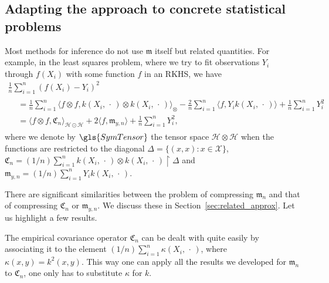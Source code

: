 \documentclass[10pt]{amsart}
\theoremstyle{definition}\newtheorem{defi}[theo]{Definition}\newtheorem{rema}[theo]{Remark}\newtheorem{exam}[theo]{Example}\newtheorem{exem}[theo]{Example}\newtheorem{nota}[theo]{Notation}
\theoremstyle{remark}
\newcommand{\restrr}
{\!\!\upharpoonright\!\!}
\newcommand{\X}{\mathcal{X}}
\newcommand{\cH}{\mathcal{H}}
\newcommand{\fkC}{\mathfrak{C}}
\newcommand{\mean}{\mathfrak{m}}
\begin{document}
\subsection{Adapting the approach to concrete statistical problems} \label{sec:intro_application}
Most methods for inference do not use $\mean$ itself but related quantities. For example, in the least squares problem, where we try to fit observations $Y_i$ through $f(X_i)$ with some function $f$ in an RKHS, we have
\begin{multline*}
\frac{1}{n} \sum_{i=1}^n (f(X_i) - Y_i)^2
\\
\begin{aligned}
&= \frac{1}{n} \sum_{i=1}^n \bigl\langle f \otimes f, k(X_i,\,\cdot\,) \otimes k(X_i,\,\cdot\,) \bigr\rangle_{\otimes} - \frac{2}{n} \sum_{i=1}^n \langle f, Y_i k(X_i,\,\cdot\,) \rangle + \frac{1}{n} \sum_{i=1}^n Y_i^2 \\
&= \langle f \otimes f, \fkC_n \rangle_{\cH \odot \cH} + 2 \langle f, \mean_{y,n} \rangle + \frac{1}{n} \sum_{i=1}^n Y_i^2,
\end{aligned}
\end{multline*}
where we denote by $\gls{SymTensor}$ the tensor space $\cH \otimes \cH$ when the functions are restricted to the diagonal $\Delta = \{(x,x) : x \in \X\}$, $\fkC_n = (1/n) \sum_{i=1}^n k(X_i,\,\cdot\,) \otimes k(X_i,\,\cdot\,)\restrr \Delta$ and $\mean_{y,n} = (1/n) \sum_{i=1}^n Y_i k(X_i,\,\cdot\,)$.

There are significant similarities between the problem of compressing $\mean_n$ and that of compressing $\fkC_n$ or $\mean_{y,n}$. We discuss these in Section~\ref{sec:related_approx}. Let us highlight a few results.

The empirical covariance operator $\fkC_n$ can be dealt with quite easily by associating it to the element $(1/n) \sum_{i=1}^n \kappa(X_i,\,\cdot\,)$, where $\kappa(x,y) = k^2(x,y)$. This way one can apply all the results we developed for $\mean_n$ to $\fkC_n$, one only has to substitute $\kappa$ for $k$.
\end{document}
